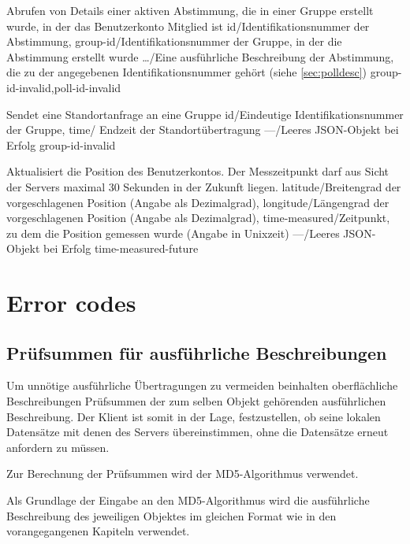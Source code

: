 \documentclass[parskip=full,11pt]{scrartcl}
\begin{document}
{Abrufen von Details einer aktiven Abstimmung, die in einer Gruppe erstellt
wurde, in der das Benutzerkonto Mitglied ist}
{id/Identifikationsnummer der Abstimmung,
group-id/Identifikationsnummer der Gruppe{,} in der die Abstimmung erstellt
wurde}
{\dots/Eine ausführliche Beschreibung der Abstimmung{,} die zu der angegebenen
Identifikationsnummer gehört (siehe \ref{sec:polldesc})}
{group-id-invalid,poll-id-invalid}

{Sendet eine Standortanfrage an eine Gruppe}
{id/Eindeutige Identifikationsnummer der Gruppe,
time/ Endzeit der Standortübertragung}
{---/Leeres JSON-Objekt bei Erfolg}
{group-id-invalid}

{Aktualisiert die Position des Benutzerkontos.
Der Messzeitpunkt darf aus Sicht der Servers maximal 30 Sekunden in der Zukunft
liegen.}
{latitude/Breitengrad der vorgeschlagenen Position (Angabe als Dezimalgrad),
longitude/Längengrad der vorgeschlagenen Position (Angabe als Dezimalgrad),
time-measured/Zeitpunkt{,} zu dem die Position gemessen wurde (Angabe in
Unixzeit)}
{---/Leeres JSON-Objekt bei Erfolg}
{time-measured-future}

\section{Error codes}\label{sec:errorcodes}
\apiErrorTable

\subsection{Prüfsummen für ausführliche Beschreibungen}\label{sec:checksum}
\newcommand{\hashAlg}{MD5}
Um unnötige ausführliche Übertragungen zu vermeiden beinhalten oberflächliche
Beschreibungen Prüfsummen der zum selben Objekt gehörenden ausführlichen
Beschreibung.
Der Klient ist somit in der Lage, festzustellen, ob seine lokalen Datensätze
mit denen des Servers übereinstimmen, ohne die Datensätze erneut anfordern zu
müssen.

\par Zur Berechnung der Prüfsummen wird der \hashAlg-Algorithmus verwendet.

\par Als Grundlage der Eingabe an den \hashAlg-Algorithmus wird die
ausführliche Beschreibung des jeweiligen Objektes im gleichen Format wie in den
vorangegangenen Kapiteln verwendet.
\end{document}
